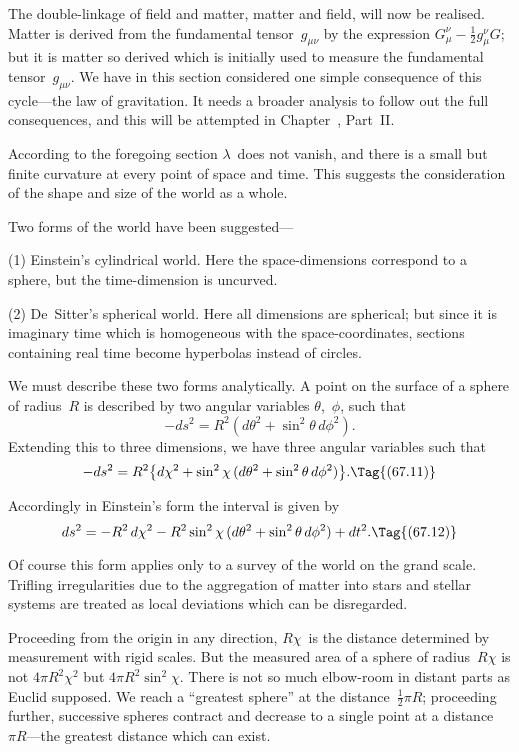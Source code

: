 \documentclass[12pt]{book}
\begin{document}
The double-linkage of field and matter, matter and field, will now be
realised. Matter is derived from the fundamental tensor~$g_{\mu\nu}$ by the expression
$G_{\mu}^{\nu} - \tfrac{1}{2}g_{\mu}^{\nu}G$; but it is matter so derived which is initially used to measure
the fundamental tensor~$g_{\mu\nu}$. We have in this section considered one simple
consequence of this cycle---the law of gravitation. It needs a broader analysis
to follow out the full consequences, and this will be attempted in Chapter~,
Part~II\@.


According to the foregoing section $\lambda$~does not vanish, and there is a
small but finite curvature at every point of space and time. This suggests
the consideration of the shape and size of the world as a whole.
%

Two forms of the world have been suggested---

(1) Einstein's cylindrical world. Here the space-dimensions correspond
%
%
to a sphere, but the time-dimension is uncurved.

(2) De~Sitter's spherical world. Here all dimensions are spherical; but
%
%
%
since it is imaginary time which is homogeneous with the space-coordinates,
sections containing real time become hyperbolas instead of circles.

We must describe these two forms analytically. A point on the surface of
a sphere of radius~$R$ is described by two angular variables $\theta$,~$\phi$, such that
\[
-ds^{2} = R^{2}(d\theta^{2} + \sin^{2}\theta\, d\phi^{2}).
\]
Extending this to three dimensions, we have three angular variables such that
\[
-ds^{2} = R^{2}\bigl\{d\chi^{2} + \sin^{2}\chi\, (d\theta^{2} + \sin^{2}\theta\, d\phi^{2})\bigr\}.
\Tag{(67.11)}
\]

Accordingly in Einstein's form the interval is given by
\[
ds^{2} = -R^{2}\, d\chi^{2} - R^{2} \sin^{2}\chi\, (d\theta^{2} + \sin^{2}\theta\, d\phi^{2}) + dt^{2}.
\Tag{(67.12)}
\]

Of course this form applies only to a survey of the world on the grand
scale. Trifling irregularities due to the aggregation of matter into stars and
stellar systems are treated as local deviations which can be disregarded.

Proceeding from the origin in any direction, $R\chi$~is the distance determined
%
by measurement with rigid scales. But the measured area of a sphere of radius~$R\chi$
is not $4\pi R^{2}\chi^{2}$ but $4\pi R^{2} \sin^{2}\chi$. There is not so much elbow-room in distant
parts as Euclid supposed. We reach a ``greatest sphere'' at the distance~$\frac{1}{2}\pi R$;
proceeding further, successive spheres contract and decrease to a single point
at a distance~$\pi R$---the greatest distance which can exist.
\end{document}
